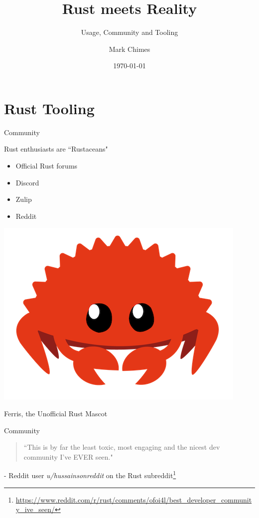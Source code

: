 \documentclass{beamer}
\title{Rust meets Reality}
\subtitle{Usage, Community and Tooling}
\author{Mark Chimes}
\date{\today}
\begin{document}
\begin{frame}
    \titlepage
\end{frame}


\section{Rust Tooling} 



\begin{frame}{Community} 




\begin{block}{Rust enthusiasts are ``Rustaceans"}
\begin{itemize}[label=$\bullet$] 
\item Official Rust forums
\item Discord
\item Zulip
\item Reddit
\end{itemize}
\end{block}


\begin{center}
\includegraphics[scale=0.1]{cuddlyferris}

Ferris, the Unofficial Rust Mascot
\end{center}

\end{frame}



\begin{frame}{Community} 
\begin{block}{}
\begin{quote}
``This is by far the least toxic, most engaging and the nicest dev community I've EVER seen."
\end{quote}
\end{block}
- Reddit user \emph{u/hussainsonreddit} on the Rust subreddit\footnote{\url{https://www.reddit.com/r/rust/comments/ofoi4l/best_developer_community_ive_seen/}}
\end{frame}
\end{document}
